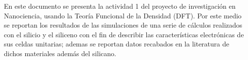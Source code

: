 
\noindent 				%
En este documento se presenta la actividad 1 del proyecto de investigación en Nanociencia,
usando la Teoría Funcional de la Densidad (DFT). 
Por este medio se reportan los resultados de las simulaciones de una serie de cálculos 
realizados con el silicio y el siliceno con el fin de describir las características electrónicas de sus
celdas unitarias; ademas se reportan datos recabados en la literatura de dichos 
materiales además del silicano.